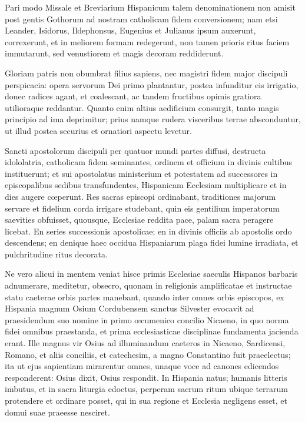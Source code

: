 \documentclass[letter,11pt]{book}
\begin{document}
 Pari modo Missale et Breviarium Hispanicum talem denominationem non amisit post gentis Gothorum ad nostram catholicam fidem conversionem; nam etsi Leander, Isidorus, Ildephonsus, Eugenius et Julianus ipsum auxerunt, correxerunt, et in meliorem formam redegerunt, non tamen prioris ritus faciem immutarunt, sed venustiorem et magis decoram reddiderunt.

Gloriam patris non obumbrat filius sapiens, nec magistri fidem major discipuli perspicacia: opera servorum Dei primo plantantur, postea infunditur eis irrigatio, donec radices agant, et coalescant, ac tandem fructibus opimis gratiora utilioraque reddantur. Quanto enim altius aedificium consurgit, tanto magis principio ad ima deprimitur; prius namque rudera visceribus terrae absconduntur, ut illud postea securius et ornatiori aspectu levetur.

Sancti apostolorum discipuli per quatuor mundi partes diffusi, destructa idololatria, catholicam fidem seminantes, ordinem et officium in divinis cultibus instituerunt; et sui apostolatus ministerium et potestatem ad successores in episcopalibus sedibus transfundentes, Hispanicam Ecclesiam multiplicare et in dies augere cœperunt. Res sacras episcopi ordinabant, traditiones majorum servare et fidelium corda irrigare studebant, quin eis gentilium imperatorum saevities obfuisset, quousque, Ecclesiae reddita pace, palam sacra peragere licebat. En series successionis apostolicae; en in divinis officiis ab apostolis ordo descendens; en denique haec occidua Hispaniarum plaga fidei lumine irradiata, et pulchritudine ritus decorata.

Ne vero alicui in mentem veniat hisce primis Ecclesiae saeculis Hispanos barbaris adnumerare, meditetur, obsecro, quonam in religionis amplificatae et instructae statu caeterae orbis partes manebant, quando inter omnes orbis episcopos, ex Hispania magnum Osium Cordubensem sanctus Silvester evocavit ad praesidendum suo nomine in primo œcumenico concilio Nicaeno, in quo norma fidei omnibus praestanda, et prima ecclesiasticae disciplinae fundamenta jacienda erant. Ille magnus vir Osius ad illuminandum caeteros in Nicaeno, Sardicensi, Romano, et aliis conciliis, et catechesim, a magno Constantino fuit praeelectus; ita ut ejus sapientiam mirarentur omnes, unaque voce ad canones edicendos responderent: Osius dixit, Osius respondit. In Hispania natus; humanis litteris imbutus, et in sacra liturgia edoctus, perperam sacrum ritum ubique terrarum protendere et ordinare posset, qui in sua regione et Ecclesia negligens esset, et domui suae praeesse nesciret.
\end{document}
